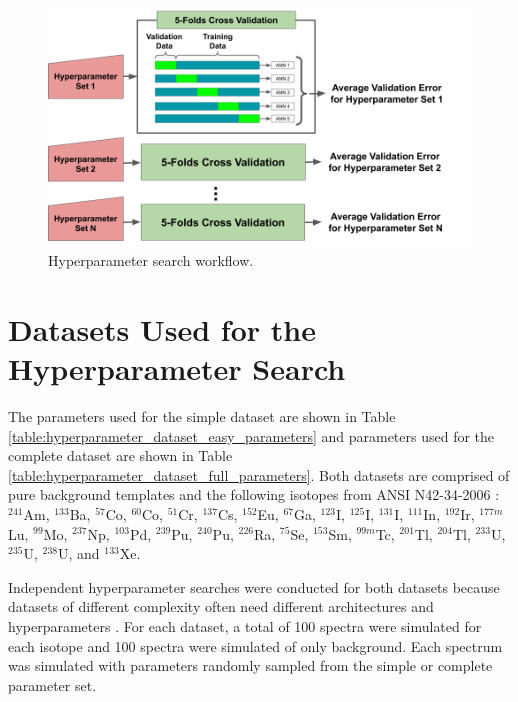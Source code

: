 \begin{figure}[H]
	\centering
	\includegraphics[trim=0 0 40 0,clip,width=1.0\linewidth]{images/hyperparameter_search_workflow}
	\caption{Hyperparameter search workflow.}
	\label{fig:hyperparameter_search_workflow}
\end{figure}


\section{Datasets Used for the Hyperparameter Search} \label{datasets_used_hyperparam_search}

The parameters used for the simple dataset are shown in Table \ref{table:hyperparameter_dataset_easy_parameters} and parameters used for the complete dataset are shown in Table \ref{table:hyperparameter_dataset_full_parameters}. Both datasets are comprised of pure background templates and the following isotopes from ANSI N42-34-2006 \cite{ANSI}: $^{241}$Am, $^{133}$Ba, $^{57}$Co, $^{60}$Co, $^{51}$Cr, $^{137}$Cs, $^{152}$Eu, $^{67}$Ga, $^{123}$I, $^{125}$I, $^{131}$I, $^{111}$In, $^{192}$Ir, $^{177m}$Lu, $^{99}$Mo, $^{237}$Np, $^{103}$Pd, $^{239}$Pu, $^{240}$Pu, $^{226}$Ra, $^{75}$Se, $^{153}$Sm, $^{99m}$Tc, $^{201}$Tl, $^{204}$Tl, $^{233}$U, $^{235}$U, $^{238}$U, and $^{133}$Xe.

Independent hyperparameter searches were conducted for both datasets because datasets of different complexity often need different architectures and hyperparameters \cite{Bergstra2012}. For each dataset, a total of 100 spectra were simulated for each isotope and 100 spectra were simulated of only background. Each spectrum was simulated with parameters randomly sampled from the simple or complete parameter set.

